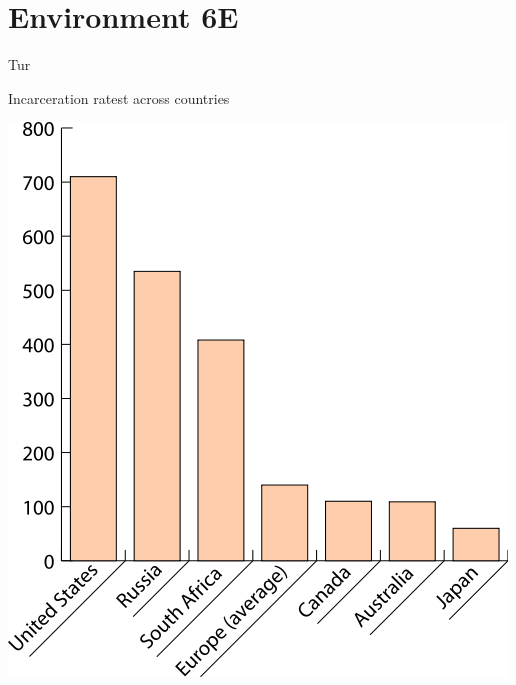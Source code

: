 \section{Environment 6E}

\lipsum[1-4]

\begin{chart}{T}{ur}
\caption{Incarceration ratest across countries}
\label{chart:incarceration}
\includegraphics[width=\chartwidth,height=\chartheight]{incarceration}  
\end{chart}

